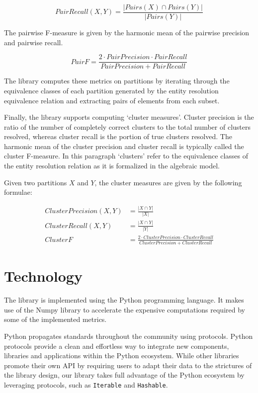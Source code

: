 \documentclass[11pt]{article}
\begin{document}
    \[ Pair Recall(X, Y) = \frac{|{Pairs(X)}\cap{Pairs(Y)}|}{|Pairs(Y)|} \]

    The pairwise F-measure is given by the harmonic mean of the pairwise
    precision and pairwise recall.

    \[ Pair F = \frac{2 \cdot Pair Precision \cdot Pair Recall}{Pair Precision + Pair Recall} \]

    The library computes these metrics on partitions by iterating through the
    equivalence classes of each partition generated by the entity resolution
    equivalence relation and extracting pairs of elements from each subset.
    
    Finally, the library supports computing `cluster measures'\cite{hitesh2012}.
    Cluster precision is the ratio of the number of completely correct
    clusters to the total number of clusters resolved, whereas cluster recall
    is the portion of true clusters resolved\cite{huang2006efficient}.
    The harmonic mean of the cluster precision and cluster recall is typically
    called the cluster F-measure.
    In this paragraph `clusters' refer to the equivalence classes of the entity
    resolution relation as it is formalized in the algebraic model.
    
    Given two partitions $X$ and $Y$, the cluster measures are given by the
    following formulae:

    \begin{align*}
        Cluster Precision(X, Y) &= \frac{|{X}\cap{Y}|}{|X|}\\
        Cluster Recall(X, Y) &= \frac{|{X}\cap{Y}|}{|Y|}\\
        Cluster F &= \frac{2\cdot{Cluster Precision}\cdot{Cluster Recall}}{Cluster Precision + Cluster Recall}
    \end{align*}

    \section{Technology}\label{sec:tech}

    The library is implemented using the Python programming language\cite{python}.
    It makes use of the Numpy library\cite{harris2020numpy} to accelerate
    the expensive computations required by some of the implemented metrics.

    Python propagates standards throughout the community using protocols.
    Python protocols\cite{pyproto2017} provide a clean and effortless way to
    integrate new components, libraries and applications within the Python
    ecosystem.
    While other libraries\cite{nmeth2020scipy} promote their own API by
    requiring users to adapt their data to the strictures of the library design,
    our library takes full advantage of the Python ecosystem by leveraging
    protocols, such as \texttt{Iterable} and \texttt{Hashable}.
\end{document}
